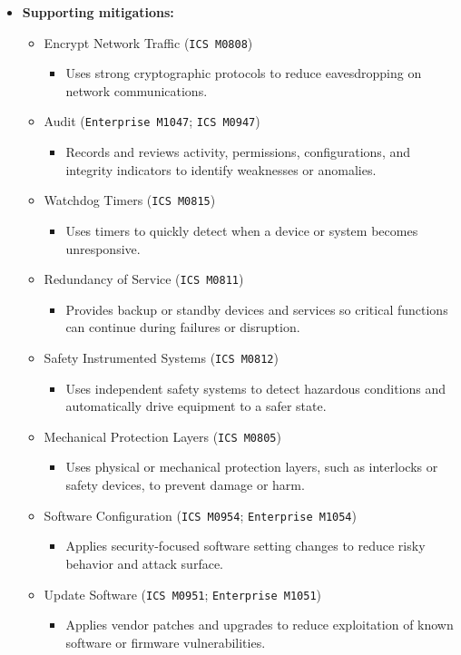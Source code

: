 \documentclass[10pt,a4paper,oneside]{report}
\begin{document}
\begin{itemize}
\item \textbf{Supporting mitigations:}
\begin{itemize}
\item Encrypt Network Traffic (\texttt{ICS M0808})
\begin{itemize}
\item Uses strong cryptographic protocols to reduce eavesdropping on network communications.
\end{itemize}
\item Audit (\texttt{Enterprise M1047}; \texttt{ICS M0947})
\begin{itemize}
\item Records and reviews activity, permissions, configurations, and integrity indicators to identify weaknesses or anomalies.
\end{itemize}
\item Watchdog Timers (\texttt{ICS M0815})
\begin{itemize}
\item Uses timers to quickly detect when a device or system becomes unresponsive.
\end{itemize}
\item Redundancy of Service (\texttt{ICS M0811})
\begin{itemize}
\item Provides backup or standby devices and services so critical functions can continue during failures or disruption.
\end{itemize}
\item Safety Instrumented Systems (\texttt{ICS M0812})
\begin{itemize}
\item Uses independent safety systems to detect hazardous conditions and automatically drive equipment to a safer state.
\end{itemize}
\item Mechanical Protection Layers (\texttt{ICS M0805})
\begin{itemize}
\item Uses physical or mechanical protection layers, such as interlocks or safety devices, to prevent damage or harm.
\end{itemize}
\item Software Configuration (\texttt{ICS M0954}; \texttt{Enterprise M1054})
\begin{itemize}
\item Applies security-focused software setting changes to reduce risky behavior and attack surface.
\end{itemize}
\item Update Software (\texttt{ICS M0951}; \texttt{Enterprise M1051})
\begin{itemize}
\item Applies vendor patches and upgrades to reduce exploitation of known software or firmware vulnerabilities.
\end{itemize}
\end{itemize}
\end{itemize}
\end{document}
